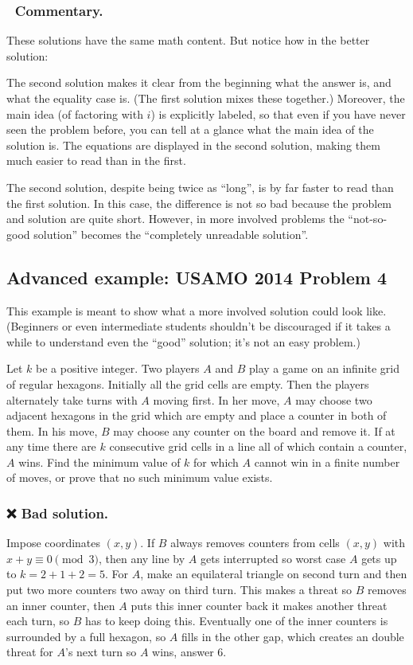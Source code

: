 \documentclass[11pt]{scrartcl}
\begin{document}
\subsubsection*{💬 Commentary.}
These solutions have the same math content.
But notice how in the better solution:
\begin{itemize}
  \ii The second solution makes it clear
  from the beginning what the answer is, and what the equality case is.
  (The first solution mixes these together.)
  \ii Moreover, the main idea (of factoring with $i$) is explicitly labeled,
  so that even if you have never seen the problem before,
  you can tell at a glance what the main idea of the solution is.
  \ii The equations are displayed in the second solution,
  making them much easier to read than in the first.
\end{itemize}
The second solution, despite being twice as ``long'',
is by far faster to read than the first solution.
In this case, the difference is not so bad because the
problem and solution are quite short.
However, in more involved problems the ``not-so-good solution''
becomes the ``completely unreadable solution''.

\subsection{Advanced example: USAMO 2014 Problem 4}
This example is meant to show what a more involved solution could look like.
(Beginners or even intermediate students shouldn't be discouraged
if it takes a while to understand even the ``good'' solution; it's not an easy problem.)

\begin{example}
  Let $k$ be a positive integer.
  Two players $A$ and $B$ play a game on an infinite grid of regular hexagons.
  Initially all the grid cells are empty.
  Then the players alternately take turns with $A$ moving first.
  In her move, $A$ may choose two adjacent hexagons in the grid
  which are empty and place a counter in both of them.
  In his move, $B$ may choose any counter on the board and remove it.
  If at any time there are $k$ consecutive grid cells
  in a line all of which contain a counter, $A$ wins.
  Find the minimum value of $k$ for which $A$ cannot
  win in a finite number of moves, or prove that no such minimum value exists.
\end{example}

\subsubsection*{❌ Bad solution.}
Impose coordinates $(x,y)$.
If $B$ always removes counters from cells $(x,y)$ with $x + y \equiv 0 \pmod 3$,
then any line by $A$ gets interrupted so worst case $A$ gets up to $k=2+1+2=5$.
For $A$, make an equilateral triangle on second turn
and then put two more counters two away on third turn.
This makes a threat so $B$ removes an inner counter,
then $A$ puts this inner counter back it makes another threat each turn,
so $B$ has to keep doing this.
Eventually one of the inner counters is surrounded by a full hexagon,
so $A$ fills in the other gap,
which creates an double threat for $A$'s next turn so $A$ wins, answer $6$.
\end{document}
